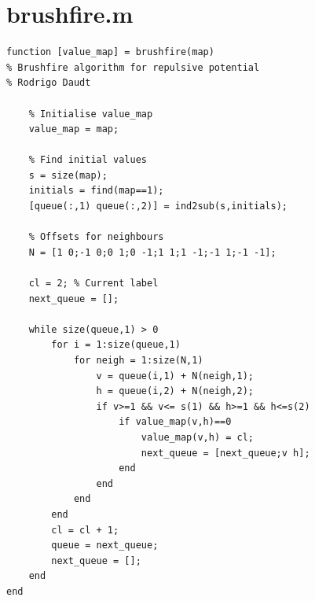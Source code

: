 \documentclass[journal]{IEEEtran}
\begin{document}
\appendices


\begin{figure}
\section{brushfire.m}\label{brushm}
    \begin{verbatim}
function [value_map] = brushfire(map)
% Brushfire algorithm for repulsive potential
% Rodrigo Daudt

    % Initialise value_map
    value_map = map;

    % Find initial values
    s = size(map);
    initials = find(map==1);
    [queue(:,1) queue(:,2)] = ind2sub(s,initials);

    % Offsets for neighbours
    N = [1 0;-1 0;0 1;0 -1;1 1;1 -1;-1 1;-1 -1];

    cl = 2; % Current label
    next_queue = [];

    while size(queue,1) > 0
        for i = 1:size(queue,1)
            for neigh = 1:size(N,1)
                v = queue(i,1) + N(neigh,1);
                h = queue(i,2) + N(neigh,2);
                if v>=1 && v<= s(1) && h>=1 && h<=s(2)
                    if value_map(v,h)==0
                        value_map(v,h) = cl;
                        next_queue = [next_queue;v h];
                    end
                end
            end
        end
        cl = cl + 1;
        queue = next_queue;
        next_queue = [];
    end
end
\end{verbatim}
\color{black}
\end{figure}
\end{document}
